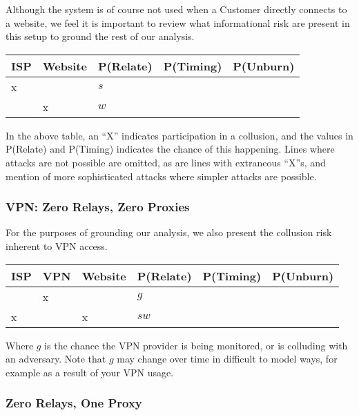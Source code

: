 Although the \Orchid{} system is of course not used when a Customer
directly connects to a website, we feel it is important to review what
informational risk are present in this setup to ground the rest of our
analysis.

\begin{center}
\begin{tabular}{l | l | l | l | l}
  ISP & Website & P(Relate)          & P(Timing)  & P(Unburn) \\
  \hline
  x   &         & $s$                & & \\
  \hline
      & x       & $w$                & & \\
\end{tabular}
\end{center}

In the above table, an ``X'' indicates participation in a collusion,
and the values in P(Relate) and P(Timing) indicates the chance of this
happening. Lines where attacks are not possible are omitted, as are
lines with extraneous ``X''s, and mention of more sophisticated
attacks where simpler attacks are possible.

\subsubsection*{VPN: Zero Relays, Zero Proxies}

For the purposes of grounding our analysis, we also present the
collusion risk inherent to VPN access.

\begin{center}
\begin{tabular}{l | l | l | l | l | l}
  ISP & VPN & Website & P(Relate)          & P(Timing) & P(Unburn) \\
  \hline
      & x   &         & $g$                & & \\
  \hline
  x   &     & x       & $sw$               & & \\
\end{tabular}
\end{center}

Where $g$ is the chance the VPN provider is being monitored, or is
colluding with an adversary. Note that $g$ may change over time in
difficult to model ways, for example as a result of your VPN usage.

\subsubsection*{Zero Relays, One Proxy}

